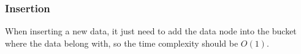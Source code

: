 \subsubsection{Insertion}

When inserting a new data, it just need to add the data node into the bucket where the data belong with, so the time complexity should be $O(1)$.
